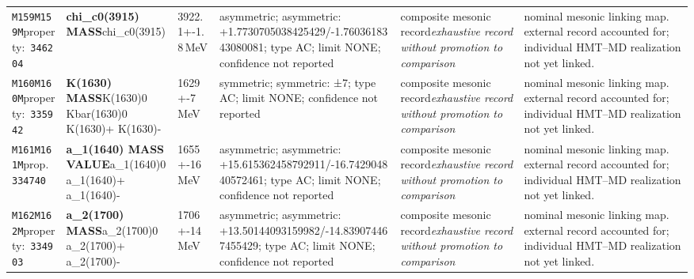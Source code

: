 \begin{landscape}
\begin{longtable}{L{1.85cm}L{4.45cm}L{2.35cm}L{4.05cm}L{3.35cm}L{7.15cm}}
\texttt{M159}\newline \texttt{M159M}\newline property:\ \texttt{346204} & \textbf{chi\_\allowbreak{}c0(3915) MASS}\newline chi\_\allowbreak{}c0(3915) & 3922.1+-1.8\,MeV & asymmetric; asymmetric: +1.7730705038425429/-1.7603618343080081; type AC; limit NONE; confidence not reported & composite mesonic record\newline \emph{exhaustive record without promotion to comparison} & nominal mesonic linking map. external record accounted for; individual HMT--MD realization not yet linked. \\
\texttt{M160}\newline \texttt{M160M}\newline property:\ \texttt{335942} & \textbf{K(1630) MASS}\newline K(1630)0 \textbar{}\allowbreak{} Kbar(1630)0 \textbar{}\allowbreak{} K(1630)+ \textbar{}\allowbreak{} K(1630)- & 1629+-7\,MeV & symmetric; symmetric: ±7; type AC; limit NONE; confidence not reported & composite mesonic record\newline \emph{exhaustive record without promotion to comparison} & nominal mesonic linking map. external record accounted for; individual HMT--MD realization not yet linked. \\
\texttt{M161}\newline \texttt{M161M}\newline prop.\ \texttt{334740} & \textbf{a\_\allowbreak{}1(1640) MASS VALUE}\newline a\_\allowbreak{}1(1640)0 \textbar{}\allowbreak{} a\_\allowbreak{}1(1640)+ \textbar{}\allowbreak{} a\_\allowbreak{}1(1640)- & 1655+-16\,MeV & asymmetric; asymmetric: +15.615362458792911/-16.742904840572461; type AC; limit NONE; confidence not reported & composite mesonic record\newline \emph{exhaustive record without promotion to comparison} & nominal mesonic linking map. external record accounted for; individual HMT--MD realization not yet linked. \\
\texttt{M162}\newline \texttt{M162M}\newline property:\ \texttt{334903} & \textbf{a\_\allowbreak{}2(1700) MASS}\newline a\_\allowbreak{}2(1700)0 \textbar{}\allowbreak{} a\_\allowbreak{}2(1700)+ \textbar{}\allowbreak{} a\_\allowbreak{}2(1700)- & 1706+-14\,MeV & asymmetric; asymmetric: +13.50144093159982/-14.839074467455429; type AC; limit NONE; confidence not reported & composite mesonic record\newline \emph{exhaustive record without promotion to comparison} & nominal mesonic linking map. external record accounted for; individual HMT--MD realization not yet linked. \\

\end{longtable}
\end{landscape}
